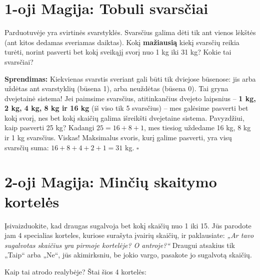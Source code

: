 \documentclass[11pt,a4paper]{scrartcl}
\newenvironment{solution}
    {\begin{list}{}{\setlength{\leftmargin}{10pt}\setlength{\rightmargin}{10pt}}\item[]}
    {\end{list}}
\begin{document}
\section{1-oji Magija: Tobuli svarsčiai}

\begin{example}
Parduotuvėje yra svirtinės svarstyklės. Svarsčius galima dėti tik ant vienos lėkštės (ant kitos dedamas sveriamas daiktas). Kokį \textbf{mažiausią} kiekį svarsčių reikia turėti, norint pasverti bet kokį sveikąjį svorį nuo 1 kg iki 31 kg? Kokie tai svarsčiai?
\end{example}

\begin{solution}
\textbf{Sprendimas:}
Kiekvienas svarstis sveriant gali būti tik dviejose būsenose: jis arba uždėtas ant svarstyklių (būsena 1), arba neuždėtas (būsena 0). Tai gryna dvejetainė sistema!
Jei paimsime svarsčius, atitinkančius dvejeto laipsnius – \textbf{1 kg, 2 kg, 4 kg, 8 kg ir 16 kg} (iš viso tik 5 svarsčius) – mes galėsime pasverti bet kokį svorį, nes bet kokį skaičių galima išreikšti dvejetaine sistema.
Pavyzdžiui, kaip pasverti 25 kg? Kadangi $25 = 16 + 8 + 1$, mes tiesiog uždedame 16 kg, 8 kg ir 1 kg svarsčius. Viskas!
Maksimalus svoris, kurį galime pasverti, yra visų svarsčių suma: $16+8+4+2+1 = 31$ kg. \hfill $\square$
\end{solution}

\section{2-oji Magija: Minčių skaitymo kortelės}

Įsivaizduokite, kad draugas sugalvoja bet kokį skaičių nuo 1 iki 15. Jūs parodote jam 4 specialias korteles, kuriose surašyta įvairių skaičių, ir paklausiate: \textit{„Ar tavo sugalvotas skaičius yra pirmoje kortelėje? O antroje?“} 
Draugui atsakius tik „Taip“ arba „Ne“, jūs akimirksniu, be jokio vargo, pasakote jo sugalvotą skaičių. 

Kaip tai atrodo realybėje? Štai šios 4 kortelės:
\end{document}
